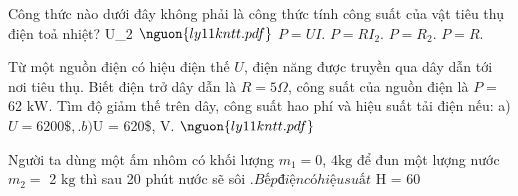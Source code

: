 \begin{ex}
Công thức nào dưới đây không phải là công thức tính công suất của vật tiêu thụ điện toả nhiệt? U_2 $\nguon{ly11 kntt.pdf}$
\choice
{$P = UI$.}
{$P = RI_2$.}
{\True $P = R_2$.}
{$P = R$.}
\end{ex}

\begin{ex}
Từ một nguồn điện có hiệu điện thế $U$, điện năng được truyền qua dây dẫn tới nơi tiêu thụ. Biết điện trở dây dẫn là $R = 5\Omega$, công suất của nguồn điện là $P =$ 62 $\mathrm{kW}$. Tìm độ giảm thế trên dây, công suất hao phí và hiệu suất tải điện nếu: a) $U = 6200\$, $$. b) $U = 620\$, $\mathrm{V}$. $\nguon{ly11 kntt.pdf}$
\choiceTF

\end{ex}

\begin{bt}
Người ta dùng một ấm nhôm có khối lượng $m_1 = 0$, $4 \mathrm{kg}$ để đun một lượng nước $m_2 =$ 2 $\mathrm{kg}$ thì sau 20 phút nước sẽ sôi $. Bếp điện có hiệu suất$ H = 60%
\end{bt}
